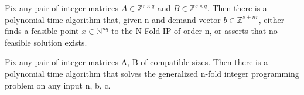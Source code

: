 \begin{proposition}
Fix any pair of integer matrices $A \in \mathbb{Z}^{r \times q}$ and $B \in \mathbb{Z}^{s \times q}$. Then there is a polynomial time algorithm that, given n and demand vector $b \in \mathbb{Z}^{s + nr}$, either finds a feasible point $x \in \mathbb{N}^{nq}$ to the N-Fold IP of order n, or asserts that no feasible solution exists.
\end{proposition}


\begin{theorem}
Fix any pair of integer matrices A, B of compatible sizes. Then there is a polynomial time algorithm that solves the generalized n-fold integer programming problem on any input n, b, c.
\end{theorem}

